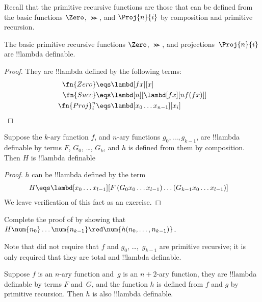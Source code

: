 \documentclass[../../../include/open-logic-section]{subfiles}
\begin{document}

Recall that the primitive recursive functions are those that can be
defined from the basic functions $\Zero$, $\Succ$, and $\Proj{n}{i}$
by composition and primitive recursion.

\begin{lem}
  The basic primitive recursive functions $\Zero$, $\Succ$, and
  projections~$\Proj{n}{i}$ are !!{lambda definable}.
\end{lem}

\begin{proof}
They are !!{lambda define}d by the following terms:
\begin{align*}
  \fn{Zero} &\eqs \lambd[fx][x]\\
  \fn{Succ} &\eqs \lambd[n][\lambd[fx][n f (f x)]] \\
  \fn{Proj}^n_i &\eqs \lambd[x_0\dots x_{n-1}][x_i] \qedhere
\end{align*}
\end{proof}

\begin{lem}
   Suppose the $k$-ary function $f$, and $n$-ary
  functions $g_0, \dots, g_{k-1}$, are !!{lambda definable} by terms
  $F$, $G_0$, \dots, $G_k$, and $h$ is defined from them by composition.
  Then $H$ is !!{lambda definable}
\end{lem}

\begin{proof}
  $h$ can be !!{lambda define}d by the term
  \begin{align*}
    H &\eqs \lambd[x_0 \dots x_{l-1}][F\, (G_0 x_0 \dots
              x_{l-1}) \dots (G_{k-1} x_0 \dots x_{l-1})]
  \end{align*}
  We leave verification of this fact as an exercise.
\end{proof}

\begin{prob}
  Complete the proof of  by showing
  that $H\num{n_0}\dots\num{n_{k-1}} \red \num{h(n_0, \dots,
    n_{k-1})}$.
\end{prob}

Note that  did not require that $f$ and $g_0$,
\dots,~$g_{k-1}$ are primitive recursive; it is only required that
they are total and !!{lambda definable}.

\begin{lem}
  Suppose $f$ is an $n$-ary function and~$g$ is an $n+2$-ary function,
  they are !!{lambda definable} by terms $F$ and~$G$, and the function
  $h$ is defined from $f$ and $g$ by primitive recursion. Then $h$ is
  also !!{lambda definable}.
\end{lem}
\end{document}
